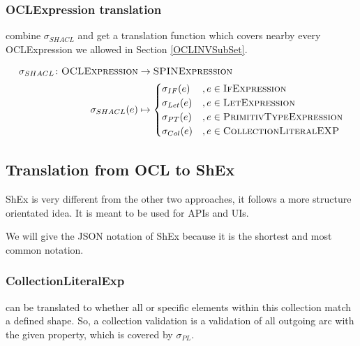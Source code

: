 \documentclass[runningheads]{llncs}
\begin{document}
\subsubsection{OCLExpression translation}
combine \(\sigma_{SHACL}\) and get a translation function which covers nearby every OCLExpression we allowed in Section \ref{OCLINVSubSet}.
\begin{definition}
    \begin{align*}
        \sigma_{SHACL}\colon\textsc{OCLExpression} & \to\textsc{SPINExpression} \\
        \sigma_{SHACL}(e)                          & \mapsto
        \begin{cases}
            \sigma_{IF}(e)  & , e \in \textsc{IfExpression}           \\
            \sigma_{Let}(e) & , e \in \textsc{LetExpression}          \\
            \sigma_{PT}(e)  & , e \in \textsc{PrimitivTypeExpression} \\
            \sigma_{Col}(e) & , e \in \textsc{CollectionLiteralEXP}
        \end{cases}
    \end{align*}
    \label{OCLtoSHACL}
\end{definition}
\subsection{Translation from OCL to ShEx}
ShEx is very different from the other two approaches, it follows a more structure orientated idea\cite{shex112018}.
It is meant to be used for APIs and UIs.

We will give the JSON notation of ShEx because it is the shortest and most common notation.
\subsubsection{CollectionLiteralExp}
can be translated to whether all or specific elements within this collection match a defined shape.
So, a collection validation is a validation of all outgoing arc with the given property, which is covered by \(\sigma_{PL}\).
\end{document}
